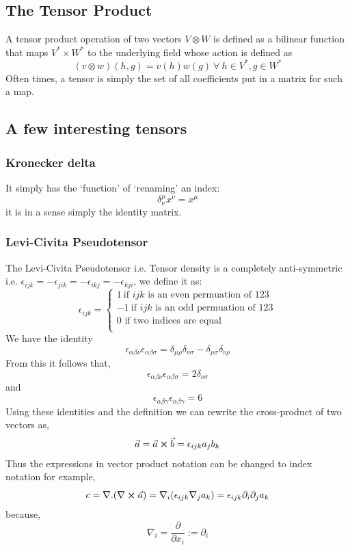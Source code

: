 \subsection{The Tensor Product}
A tensor product operation of two vectors $V \otimes W$ is defined as a bilinear function that maps $V^{*} \times W^{*}$ to the underlying field whose action is defined as
\begin{equation}
    (v \otimes w)(h,g) = v(h)w(g) \ \forall \ h \in V^{*}, g \in W^{*}
\end{equation}
Often times, a tensor is simply the set of all coefficients put in a matrix for such a map.
\subsection{A few interesting tensors}
\subsubsection{Kronecker delta}
It simply has the ‘function’ of ‘renaming’ an index:
$$\delta^{\mu}_{\nu} x^{\nu} = x^{\mu}$$
it is in a sense simply the identity matrix.
\subsubsection{Levi-Civita Pseudotensor}
\label{Levi}
The Levi-Civita Pseudotensor i.e. Tensor density is a completely anti-symmetric i.e. $\epsilon_{ijk} = -\epsilon_{jik} = -\epsilon_{ikj} = -\epsilon_{kji}$, we define it as:
\begin{equation}
\epsilon_{ijk} = \begin{cases}
1 \ \text{if } ijk \text{ is an even permuation of } 123\\
-1 \ \text{if } ijk \text{ is an odd permuation of } 123\\
0  \text{ if two indices are equal}\\
\end{cases}
\end{equation}
We have the identity
\begin{equation}
\epsilon_{\alpha \beta \nu}\epsilon_{\alpha \beta \sigma} = \delta_{\mu \rho} \delta_{\nu \sigma} - \delta_{\mu \sigma}\delta_{\nu \rho}
\end{equation}
From this it follows that,
\begin{equation}
\epsilon_{\alpha \beta \nu}\epsilon_{\alpha \beta \sigma} = 2\delta_{\nu \sigma}
\end{equation}
and
\begin{equation}
\epsilon_{\alpha \beta \gamma}\epsilon_{\alpha \beta \gamma} = 6
\end{equation}
Using these identities and the definition we can rewrite the cross-product of two vectors as,
\begin{equation}
\vec{a} = \vec{a} \cross \vec{b}  = \epsilon_{ijk}a_{j}b_{k}
\end{equation}
Thus the expressions in vector product notation can be changed to index notation for example,
$$
c = \nabla.(\nabla \cross \vec{a}) = \nabla_{i}(\epsilon_{ijk}\nabla_{j}a_{k}) = \epsilon_{ijk}\partial_{i}\partial_{j}a_{k}
$$
because,
$$\nabla_{i} = \frac{\partial}{\partial x_{i}} := \partial_{i}$$


